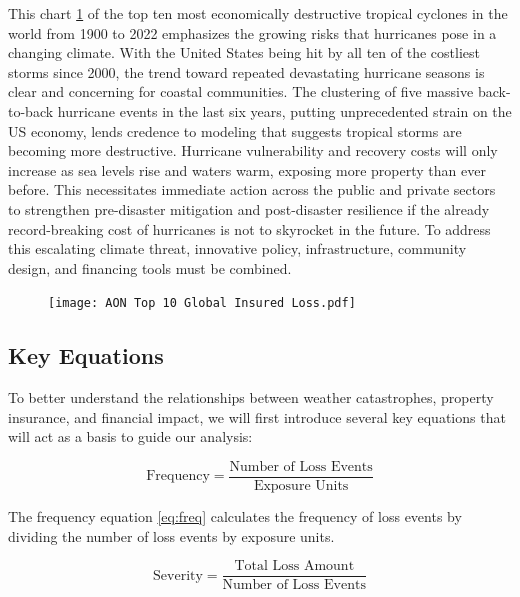 \documentclass[12pt]{article}
\begin{document}
This chart \ref{fig:10global_loss} of the top ten most economically destructive tropical cyclones in the world from 1900 to 2022 emphasizes the growing risks 
that hurricanes pose in a changing climate. With the United States being hit by all ten of the costliest storms since 2000, the trend 
toward repeated devastating hurricane seasons is clear and concerning for coastal communities. The clustering of five massive 
back-to-back hurricane events in the last six years, putting unprecedented strain on the US economy, lends credence to modeling that 
suggests tropical storms are becoming more destructive. Hurricane vulnerability and recovery costs will only increase as sea levels 
rise and waters warm, exposing more property than ever before.  This necessitates immediate action across the public and private 
sectors to strengthen pre-disaster mitigation and post-disaster resilience if the already record-breaking cost of hurricanes is not 
to skyrocket in the future. To address this escalating climate threat, innovative policy, infrastructure, community design, and 
financing tools must be combined.

\begin{figure}[ht]
    \centering
    \texttt{[image: AON Top 10 Global Insured Loss.pdf]}
    \label{fig:10global_loss}
    \cite{aon}
\end{figure}



\subsection{Key Equations}

To better understand the relationships between weather catastrophes, property insurance, and financial impact, we will first introduce 
several key equations that will act as a basis to guide our analysis:

\begin{equation}
    \label{eq:freq}
    \text{Frequency} = \frac{\text{Number of Loss Events}}{\text{Exposure Units}}
\end{equation}

The frequency equation \ref{eq:freq} calculates the frequency of loss events by dividing the number of loss events by exposure units.

\begin{equation}
    \label{eq:sev}
    \text{Severity} = \frac{\text{Total Loss Amount}}{\text{Number of Loss Events}}
\end{equation}
\end{document}
